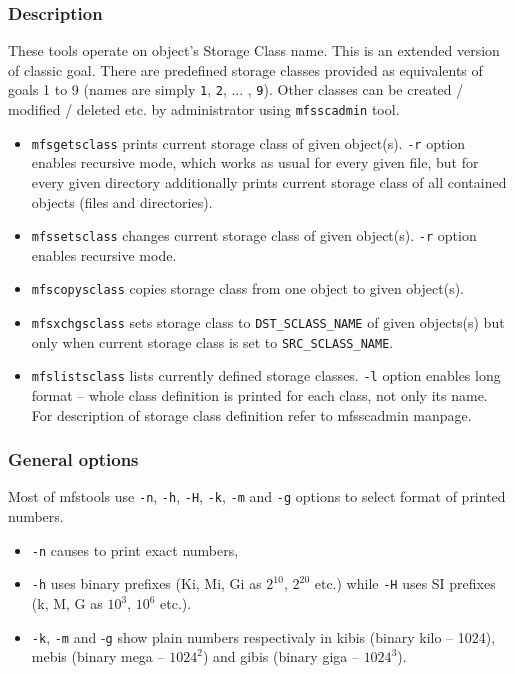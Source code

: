 \documentclass[a4paper,11pt,english]{report}
\def\code#1{\texttt{#1}}
\begin{document}
				\subsubsection{Description}
					These tools operate on object's Storage Class name. This is an extended version of classic goal.  There are predefined storage classes provided as equivalents of goals 1 to 9 (names are simply \code{1}, \code{2}, ... , \code{9}). Other classes can be created / modified / deleted etc. by administrator using \code{mfsscadmin} tool.
					\begin{itemize}
						\item \code{mfsgetsclass} prints current storage class of given object(s).  \code{-r} option enables recursive mode, which works as usual for every given file, but for every given directory additionally prints current storage class of all contained objects (files and directories).
				
						\item \code{mfssetsclass} changes current storage class of given object(s).  \code{-r} option enables recursive mode.
				
						\item \code{mfscopysclass} copies storage class from one object to given object(s).
				
						\item \code{mfsxchgsclass} sets storage class to \code{DST\_SCLASS\_NAME} of given objects(s) but only when current storage class is set to \code{SRC\_SCLASS\_NAME}.
				
						\item \code{mfslistsclass} lists currently defined storage classes. \code{-l} option enables long format -- whole class definition is printed for each class, not only its name. For description of storage class definition refer to mfsscadmin manpage.
					\end{itemize}
				
				\subsubsection{General options}
					Most of mfstools use \code{-n}, \code{-h}, \code{-H}, \code{-k}, \code{-m} and \code{-g} options to select format of printed numbers.
					
					\begin{itemize}
						\item \code{-n} causes to print exact numbers,
						\item \code{-h} uses binary prefixes (Ki, Mi, Gi as $2^{10}$, $2^{20}$ etc.) while \code{-H} uses SI prefixes (k, M, G as $10^{3}$, $10^{6}$ etc.).
						\item \code{-k}, \code{-m} and -\code{g} show plain numbers respectivaly  in  kibis (binary  kilo -- 1024), mebis (binary mega -- $1024^{2}$) and gibis (binary giga -- $1024^{3}$).
					\end{itemize}
					
\end{document}
